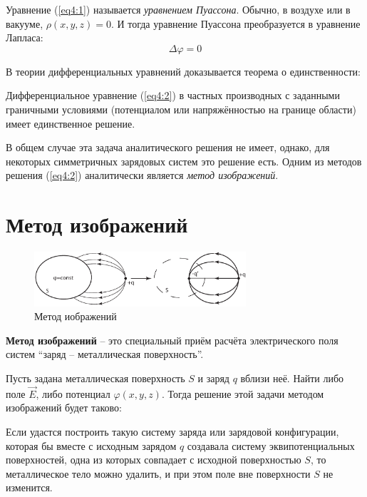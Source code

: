     Уравнение (\ref{eq4:1}) называется \textit{уравнением Пуассона}. Обычно, в
    воздухе или  в вакууме, \( \rho(x, y, z) = 0 \). И тогда уравнение Пуассона
    преобразуется в уравнение Лапласа:
    \begin{equation}
        \label{eq4:2}
        \Delta\varphi = 0
    \end{equation}

    В теории дифференциальных уравнений доказывается теорема о единственности:

    \begin{theorem}
        Дифференциальное уравнение (\ref{eq4:2}) в частных производных с
        заданными граничными условиями (потенциалом или напряжённостью на
        границе области) имеет единственное решение.
    \end{theorem}

    В общем случае эта задача аналитического решения не имеет, однако, для
    некоторых симметричных зарядовых систем это решение есть. Одним из методов
    решения (\ref{eq4:2}) аналитически является \textit{метод изображений}.

\section{Метод изображений}

    \begin{figure}[t!]
        \center
        \includegraphics[width=0.7\textwidth]{lec04/images_method.pdf}
        \caption{Метод иображений}
    \end{figure}

    \begin{definition}
        \textbf{Метод изображений} -- это специальный приём расчёта
        электрического поля систем ``заряд -- металлическая поверхность''.
    \end{definition}

    Пусть задана металлическая поверхность \( S \) и заряд \( q \) вблизи неё.
    Найти либо поле \( \vec{E} \), либо потенциал \( \varphi(x, y, z) \). Тогда
    решение этой задачи методом изображений будет таково:

    Если удастся построить такую систему заряда или зарядовой конфигурации,
    которая бы вместе с исходным зарядом \( q \) создавала систему
    эквипотенциальных поверхностей, одна из которых совпадает с исходной
    поверхностью \( S \), то металлическое тело можно удалить, и при этом поле
    вне поверхности \( S \) не изменится.

